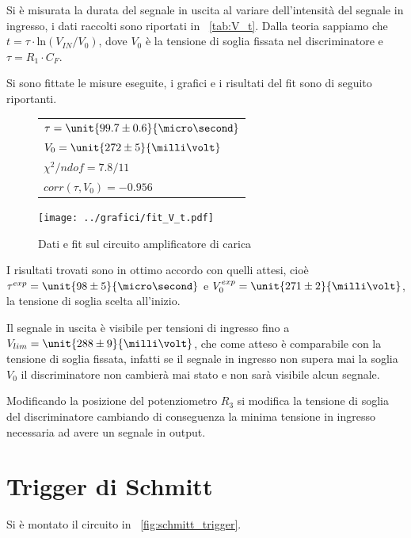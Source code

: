 \documentclass[10pt,a4paper]{article}
\begin{document}
Si è misurata la durata del segnale in uscita al variare dell'intensità del segnale in ingresso, i dati raccolti sono riportati in \tablename{~\ref{tab:V_t}}.
Dalla teoria sappiamo che $t = \tau \cdot \text{ln}(V_{IN}/V_0)$, dove $V_0$ è la tensione di soglia fissata nel discriminatore e $\tau = R_1 \cdot C_F$.

Si sono fittate le misure eseguite, i grafici e i risultati del fit sono di seguito riportanti.

\begin{figure}[H]
	\begin{minipage}{0.28\textwidth}
		\centering
		\begin{tabular}{l}
			$\tau = \unit{99.7 \pm 0.6}{\micro\second}$ \\
			$V_0 = \unit{272 \pm 5}{\milli \volt}$ \\
			$\chi^2 / ndof = 7.8/11$\\
			$corr(\tau,V_0) = -0.956$\\
		\end{tabular}
	\end{minipage}
	\begin{minipage}{0.75\textwidth}
		\centering
		\texttt{[image: ../grafici/fit\_V\_t.pdf]}
		\caption{Dati e fit sul circuito amplificatore di carica}
		\label{}
	\end{minipage}
\end{figure}

I risultati trovati sono in ottimo accordo con quelli attesi, cioè $\tau^{exp} = \unit{98 \pm 5}{\micro\second}$ e $V_0^{exp} = \unit{271 \pm 2}{\milli\volt}$, la tensione di soglia scelta all'inizio.

Il segnale in uscita è visibile per tensioni di ingresso fino a $V_{lim} = \unit{288 \pm 9}{\milli\volt}$, che come atteso è comparabile con la tensione di soglia fissata, infatti se il segnale in ingresso non supera mai la soglia $V_0$ il discriminatore non cambierà mai stato e non sarà visibile alcun segnale.

Modificando la posizione del potenziometro $R_3$ si modifica la tensione di soglia del discriminatore cambiando di conseguenza la minima tensione in ingresso necessaria ad avere un segnale in output.

\section{Trigger di Schmitt}
Si è montato il circuito in \figurename{~\ref{fig:schmitt_trigger}}.
\end{document}
